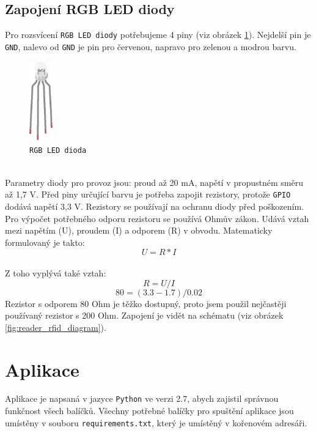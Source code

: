 \documentclass[czech,BP]{thesiskiv}
\begin{document}
\subsection{Zapojení RGB LED diody}
	Pro rozsvícení \texttt{RGB LED diody} potřebujeme 4 piny (viz obrázek \ref{fig:rgb_led_dioda}). Nejdelší pin je \texttt{GND}, nalevo od \texttt{GND} je pin pro červenou, napravo pro zelenou a modrou barvu.
	\begin{figure}[H]
		\centering
		\includegraphics[width=0.09\textwidth]{../images/rgb_led_dioda.png}	
		\caption{\texttt{RGB LED dioda}}
		\label{fig:rgb_led_dioda}
\end{figure}
\ \\
Parametry diody pro provoz jsou: proud až 20 mA, napětí v propustném směru až 1,7 V.
Před piny určující barvu je potřeba zapojit rezistory, protože \texttt{GPIO} dodává napětí 3,3 V.
Rezistory se používají na ochranu diody před poškozením. 
Pro výpočet potřebného odporu rezistoru se používá Ohmův zákon. Udává vztah mezi napětím (U), proudem (I) a odporem (R) v obvodu. Matematicky formulovaný je takto:
\[ U = R * I \]
\ \\
Z toho vyplývá také vztah:
\[ R = U/I \]
\[ 80=(3.3-1.7)/0.02 \]
Rezistor s odporem 80 Ohm je těžko dostupný, proto jsem použil nejčastěji používaný rezistor s 200 Ohm.
Zapojení je vidět na schématu (viz obrázek \ref{fig:reader_rfid_diagram}).


	\section{Aplikace}
Aplikace je napsaná v jazyce \texttt{Python} ve verzi 2.7, abych zajistil správnou funkčnost všech balíčků. Všechny potřebné balíčky pro spuštění aplikace jsou umístěny v souboru \texttt{requirements.txt}, který je umístěný v kořenovém adresáři.
\end{document}
